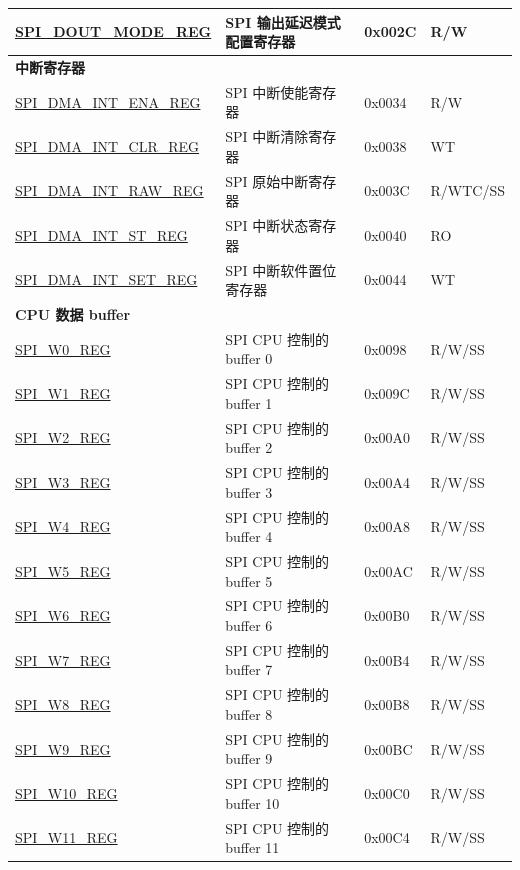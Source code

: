 \begin{longtable}{ | p{6cm} | p{6.6cm} | p{1.3cm} | p{1.7cm} | }
\hyperref[regdesc:SPIDOUTMODEREG]{SPI\_DOUT\_MODE\_REG} & SPI 输出延迟模式配置寄存器 & 0x002C & R/W \\ \hline
\multicolumn{4}{|l|}{\textbf{中断寄存器}} \\ \hline
\hyperref[regdesc:SPIDMAINTENAREG]{SPI\_DMA\_INT\_ENA\_REG} & SPI 中断使能寄存器  & 0x0034 & R/W \\ \hline
\hyperref[regdesc:SPIDMAINTCLRREG]{SPI\_DMA\_INT\_CLR\_REG} & SPI 中断清除寄存器& 0x0038 & WT \\ \hline
\hyperref[regdesc:SPIDMAINTRAWREG]{SPI\_DMA\_INT\_RAW\_REG} & SPI 原始中断寄存器 & 0x003C & R/WTC/SS \\ \hline
\hyperref[regdesc:SPIDMAINTSTREG]{SPI\_DMA\_INT\_ST\_REG} & SPI 中断状态寄存器 & 0x0040 & RO \\ \hline
\hyperref[regdesc:SPIDMAINTSETREG]{SPI\_DMA\_INT\_SET\_REG} & SPI 中断软件置位寄存器 & 0x0044 & WT \\ \hline
\multicolumn{4}{|l|}{\textbf{CPU 数据 buffer}} \\ \hline
\hyperref[regdesc:SPIW0REG]{SPI\_W0\_REG} & SPI CPU 控制的 buffer 0 & 0x0098 & R/W/SS \\ \hline
\hyperref[regdesc:SPIW1REG]{SPI\_W1\_REG} & SPI CPU 控制的 buffer 1 & 0x009C & R/W/SS \\ \hline
\hyperref[regdesc:SPIW2REG]{SPI\_W2\_REG} & SPI CPU 控制的 buffer 2 & 0x00A0 & R/W/SS \\ \hline
\hyperref[regdesc:SPIW3REG]{SPI\_W3\_REG} & SPI CPU 控制的 buffer 3 & 0x00A4 & R/W/SS \\ \hline
\hyperref[regdesc:SPIW4REG]{SPI\_W4\_REG} & SPI CPU 控制的 buffer 4 & 0x00A8 & R/W/SS \\ \hline
\hyperref[regdesc:SPIW5REG]{SPI\_W5\_REG} & SPI CPU 控制的 buffer 5 & 0x00AC & R/W/SS \\ \hline
\hyperref[regdesc:SPIW6REG]{SPI\_W6\_REG} & SPI CPU 控制的 buffer 6 & 0x00B0 & R/W/SS \\ \hline
\hyperref[regdesc:SPIW7REG]{SPI\_W7\_REG} & SPI CPU 控制的 buffer 7 & 0x00B4 & R/W/SS \\ \hline
\hyperref[regdesc:SPIW8REG]{SPI\_W8\_REG} & SPI CPU 控制的 buffer 8 & 0x00B8 & R/W/SS \\ \hline
\hyperref[regdesc:SPIW9REG]{SPI\_W9\_REG} & SPI CPU 控制的 buffer 9 & 0x00BC & R/W/SS \\ \hline
\hyperref[regdesc:SPIW10REG]{SPI\_W10\_REG} & SPI CPU 控制的 buffer 10 & 0x00C0 & R/W/SS \\ \hline
\hyperref[regdesc:SPIW11REG]{SPI\_W11\_REG} & SPI CPU 控制的 buffer 11 & 0x00C4 & R/W/SS \\ \hline

\end{longtable}
